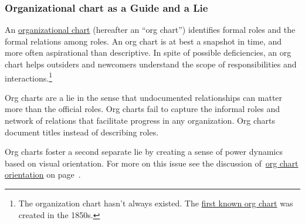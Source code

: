 \subsubsection*{Organizational chart as a Guide and a Lie\label{sec:org-chart-as-guide-and-lie}}

An \href{https://en.wikipedia.org/wiki/Organizational_chart}{organizational chart} (hereafter an ``\gls{org chart}'') identifies formal roles and the formal relations among roles. An org chart is at best a snapshot in time, and more often aspirational than descriptive. In spite of possible deficiencies, an org chart helps outsiders and newcomers understand the scope of responsibilities and interactions.\footnote{The organization chart hasn't always existed. The \href{https://en.wikipedia.org/wiki/George_Holt_Henshaw\#First_organization_chart}{first known org chart} was created in the 1850s.}

Org charts are a lie in the sense that undocumented relationships can matter more than the official roles. Org charts fail to capture the informal roles and network of relations that facilitate progress in any organization. Org charts document titles instead of describing roles.

Org charts foster a second separate lie by creating a sense of power dynamics based on visual orientation. For more on this issue see the discussion of~\hyperref[sec:org-chart-orientation]{org chart orientation} on page~\pageref{sec:org-chart-orientation}.
